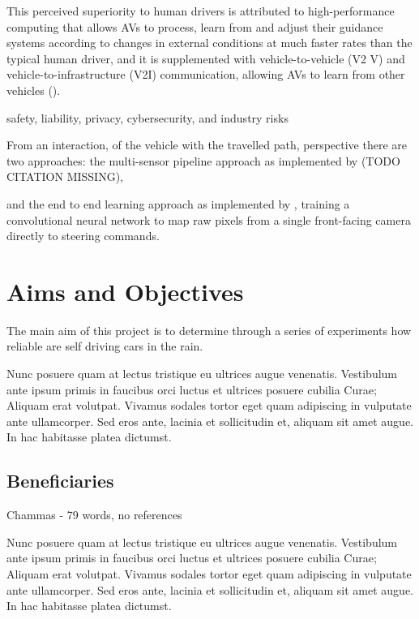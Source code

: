 This perceived superiority to human drivers is attributed to high-performance computing that allows AVs to process, learn from and adjust their guidance systems according
to changes in external conditions at much faster rates than the typical human driver, and it
is supplemented with vehicle-to-vehicle (V2 V) and vehicle-to-infrastructure (V2I) communication, allowing AVs to learn from other vehicles (\cite{west2016moving}).

safety, liability, privacy, cybersecurity, and industry risks \cite{Taeihagh_2018}

From an interaction, of the vehicle with the travelled path, perspective there are two approaches: the multi-sensor pipeline approach as implemented by (TODO CITATION MISSING), 

and the end to end learning approach as implemented by \cite{bojarski2016end}, training a convolutional neural network to map raw pixels from a single front-facing camera directly to steering commands.

\section{Aims and Objectives}


The main aim of this project is to determine through a series of experiments how reliable are self driving cars in the rain.

Nunc posuere quam at lectus tristique eu ultrices augue venenatis. Vestibulum ante ipsum primis in faucibus orci luctus et ultrices posuere cubilia Curae; Aliquam erat volutpat. Vivamus sodales tortor eget quam adipiscing in vulputate ante ullamcorper. Sed eros ante, lacinia et sollicitudin et, aliquam sit amet augue. In hac habitasse platea dictumst.

\subsection{Beneficiaries}

Chammas - 79 words, no references

Nunc posuere quam at lectus tristique eu ultrices augue venenatis. Vestibulum ante ipsum primis in faucibus orci luctus et ultrices posuere cubilia Curae; Aliquam erat volutpat. Vivamus sodales tortor eget quam adipiscing in vulputate ante ullamcorper. Sed eros ante, lacinia et sollicitudin et, aliquam sit amet augue. In hac habitasse platea dictumst.

